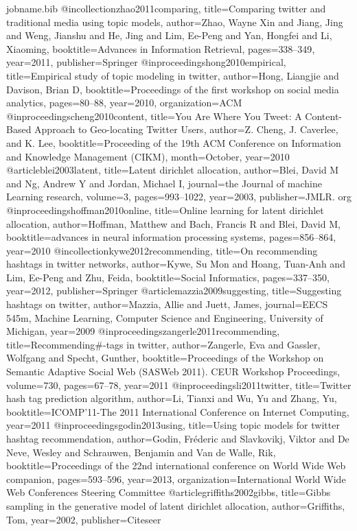 \documentclass{acm_proc_article-sp}
\begin{document}
\begin{filecontents}{jobname.bib}
@incollection{zhao2011comparing,
	title={Comparing twitter and traditional media using topic models},
	author={Zhao, Wayne Xin and Jiang, Jing and Weng, Jianshu and He, Jing and Lim, Ee-Peng and Yan, Hongfei and Li, Xiaoming},
	booktitle={Advances in Information Retrieval},
	pages={338--349},
	year={2011},
	publisher={Springer}
}
@inproceedings{hong2010empirical,
	title={Empirical study of topic modeling in twitter},
	author={Hong, Liangjie and Davison, Brian D},
	booktitle={Proceedings of the first workshop on social media analytics},
	pages={80--88},
	year={2010},
	organization={ACM}
}
@inproceedings{cheng2010content,
	title={You Are Where You Tweet: A Content-Based Approach to Geo-locating Twitter Users},
	author={Z. Cheng, J. Caverlee, and K. Lee},
	booktitle={Proceeding of the 19th ACM Conference on Information and Knowledge Management (CIKM)},
	month={October},
	year={2010}
}
@article{blei2003latent,
	title={Latent dirichlet allocation},
	author={Blei, David M and Ng, Andrew Y and Jordan, Michael I},
	journal={the Journal of machine Learning research},
	volume={3},
	pages={993--1022},
	year={2003},
	publisher={JMLR. org}
}
@inproceedings{hoffman2010online,
	title={Online learning for latent dirichlet allocation},
	author={Hoffman, Matthew and Bach, Francis R and Blei, David M},
	booktitle={advances in neural information processing systems},
	pages={856--864},
	year={2010}
}
@incollection{kywe2012recommending,
	title={On recommending hashtags in twitter networks},
	author={Kywe, Su Mon and Hoang, Tuan-Anh and Lim, Ee-Peng and Zhu, Feida},
	booktitle={Social Informatics},
	pages={337--350},
	year={2012},
	publisher={Springer}
}
@article{mazzia2009suggesting,
	title={Suggesting hashtags on twitter},
	author={Mazzia, Allie and Juett, James},
	journal={EECS 545m, Machine Learning, Computer Science and Engineering, University of Michigan},
	year={2009}
}
@inproceedings{zangerle2011recommending,
	title={Recommending\#-tags in twitter},
	author={Zangerle, Eva and Gassler, Wolfgang and Specht, Gunther},
	booktitle={Proceedings of the Workshop on Semantic Adaptive Social Web (SASWeb 2011). CEUR Workshop Proceedings},
	volume={730},
	pages={67--78},
	year={2011}
}
@inproceedings{li2011twitter,
	title={Twitter hash tag prediction algorithm},
	author={Li, Tianxi and Wu, Yu and Zhang, Yu},
	booktitle={ICOMP’11-The 2011 International Conference on Internet Computing},
	year={2011}
}
@inproceedings{godin2013using,
	title={Using topic models for twitter hashtag recommendation},
	author={Godin, Fr{\'e}deric and Slavkovikj, Viktor and De Neve, Wesley and Schrauwen, Benjamin and Van de Walle, Rik},
	booktitle={Proceedings of the 22nd international conference on World Wide Web companion},
	pages={593--596},
	year={2013},
	organization={International World Wide Web Conferences Steering Committee}
}
@article{griffiths2002gibbs,	
	title={Gibbs sampling in the generative model of latent dirichlet allocation},
	author={Griffiths, Tom},
	year={2002},
	publisher={Citeseer}
}
\end{filecontents}

\nocite{*}




\end{document}
